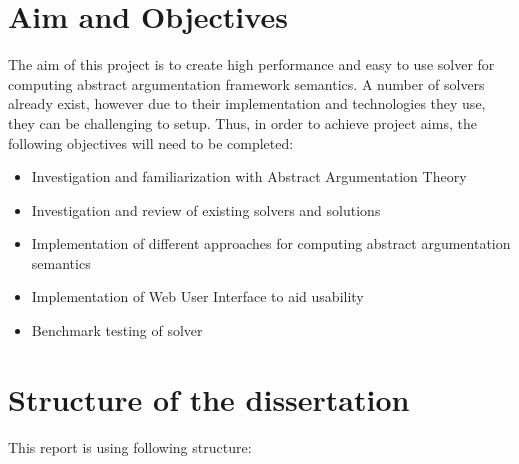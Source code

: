 \section{Aim and Objectives}
The aim of this project is to create high performance and easy to use solver for computing abstract argumentation framework semantics. A number of solvers already exist, however due to their implementation and technologies they use, they can be challenging to setup. Thus, in order to achieve project aims, the following objectives will need to be completed:
\begin{itemize}
	\item Investigation and familiarization with Abstract Argumentation Theory
	\item Investigation and review of existing solvers and solutions
	\item Implementation of different approaches for computing abstract argumentation semantics
	\item Implementation of Web User Interface to aid usability
	\item Benchmark testing of solver
\end{itemize}

\section{Structure of the dissertation}
This report is using following structure:

